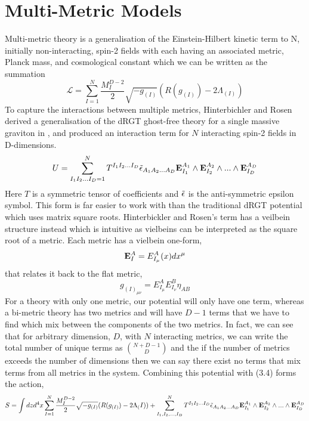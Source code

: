 \documentclass[11pt]{report}
\numberwithin{equation}{chapter}
\begin{document}
\section{Multi-Metric Models}
Multi-metric theory is a generalisation of the Einstein-Hilbert kinetic term to N, initially non-interacting, spin-2 fields with each having an associated metric, Planck mass, and cosmological constant which we can be written as the summation\cite{Hinterbichler:2012cn}
\begin{equation}
    \mathcal{L} = \sum_{I=1}^N \frac{M_I^{D-2}}{2}\sqrt{-g_{(I)}} ( R(g_{(I)})-2\Lambda_(I))
\end{equation}
To capture the interactions between multiple metrics, Hinterbichler and Rosen derived  a generalisation of the dRGT ghost-free theory for a single massive graviton in \cite{Hinterbichler:2012cn}, and produced an interaction term for $N$ interacting spin-2 fields in D-dimensions.
\begin{equation}
U=\sum^N_{I_1I_2...I_D=1}T^{I_1I_2...I_D}\Tilde{\epsilon}_{A_1A_2...A_D}\bold{E}_{I_1}^{A_1}\wedge\bold{E}_{I_2}^{A_2}\wedge ...\wedge\bold{E}_{I_D}^{A_D}
\end{equation}
Here $T$ is a symmetric tensor of coefficients and $\Tilde{\epsilon}$ is the anti-symmetric epsilon symbol. This form is far easier to work with than the traditional dRGT potential which uses matrix square roots. Hinterbickler and Rosen's term has a veilbein structure instead which is intuitive as vielbeins can be interpreted as the square root of a metric. Each metric has a vielbein one-form\cite{Kurts_review}, 
\begin{equation} 
\bold{E}^A_I = E^A_{I_\mu}(x)dx^\mu
\end{equation}
that relates it back to the flat metric, 
\begin{equation}
    g_{(I)_{\mu\nu}} = E^A_{I_\mu}E^B_{I_\nu}\eta_{AB}
\end{equation}
For a theory with only one metric, our potential will only have one term, whereas a bi-metric theory has two metrics and will have $D-1$ terms that we have to find which mix between the components of the two metrics. In fact, we can see that for arbitrary dimension, $D$, with $N$ interacting metrics, we can write the total number of unique terms as $\binom{N+D-1}{D}$ and the if the number of metrics exceeds the number of dimensions then we can say there exist no terms that mix terms from all metrics in the system\cite{Kurts_review}. Combining this potential with (3.4) forms the action,
\begin{equation}
    S = \int dzd^4x\sum_{I=1}^N \frac{M_I^{D-2}}{2}\sqrt{-g_{(I)}}(R(g_{(I)})-2\Lambda_(I)) + \sum^N_{I_1,I_2,...,I_D} T^{I_1I_2...I_D}\Tilde{\epsilon}_{A_1A_2...A_D}\bold{E}_{I_1}^{A_1}\wedge\bold{E}_{I_2}^{A_2}\wedge ...\wedge\bold{E}_{I_D}^{A_D}
\end{equation}
\end{document}

